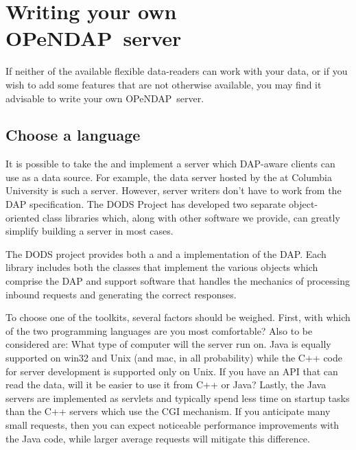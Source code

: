 \documentclass{dods-paper}
\newcommand{\opendap}{OPeNDAP}
\begin{document}
\section{Writing your own \opendap\ server}

If neither of the available flexible data-readers can work with your
data, or if you wish to add some features that are not otherwise
available, you may find it advisable to write your own \opendap\ server.
  

\subsection{Choose a language}

  
It is possible to take the 
and implement a server which DAP-aware clients can use as a data
source. For example, the data server hosted by the  at Columbia
University is such a server. However, server writers don't have to
work from the DAP specification. The DODS Project has developed two
separate object-oriented class libraries which, along with other
software we provide, can greatly simplify building a server in most
cases.


The DODS project provides both a
and a
implementation of the DAP. Each library includes both the classes that
implement the various objects which comprise the DAP and support
software that handles the mechanics of processing inbound requests and
generating the correct responses.

To choose one of the toolkits, several factors should be weighed.
First, with which of the two programming languages are you most
comfortable? Also to be considered are: What type of computer will the
server run on.  Java is equally supported on win32 and Unix (and mac,
in all probability) while the C++ code for server development is
supported only on Unix.  If you have an API that can read the data,
will it be easier to use it from C++ or Java?   Lastly, the Java
servers are implemented as servlets and typically spend less time on
startup tasks than the C++ servers which use the CGI mechanism.  If
you anticipate many small requests, then you can expect noticeable
performance improvements with the Java code, while larger average
requests will mitigate this difference.  
\end{document}

